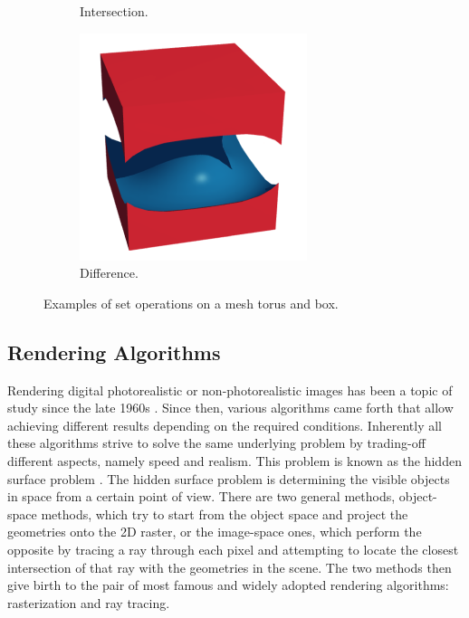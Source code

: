 \documentclass[a4paper,11pt,oneside]{article}
\begin{document}
\begin{figure}[ht]
\begin{subfigure}[b]{0.3\textwidth}
		\caption{Intersection.}
		\label{sec1:intersection}
	\end{subfigure}
	\hfill
	\begin{subfigure}[b]{0.3\textwidth}
		\centering
		\includegraphics[width=\textwidth]{section1/difference.png}
		\caption{Difference.}
		\label{sec1:difference}
	\end{subfigure}
	\hfill
	\caption{Examples of set operations on a mesh torus and box.}
	\label{sec1:set-operations-examples}
\end{figure}

  
\subsection{Rendering Algorithms}
  
Rendering digital photorealistic or non-photorealistic images has been a topic of study since the late 1960s \cite{INITIAL_RENDERING}. Since then, various algorithms came forth that allow achieving different results depending on the required conditions. Inherently all these algorithms strive to solve the same underlying problem by trading-off different aspects, namely speed and realism. This problem is known as the hidden surface problem \cite{hidden-surface-problem}. The hidden surface problem is determining the visible objects in space from a certain point of view. There are two general methods, object-space methods, which try to start from the object space and project the geometries onto the 2D raster, or the image-space ones, which perform the opposite by tracing a ray through each pixel and attempting to locate the closest intersection of that ray with the geometries in the scene. The two methods then give birth to the pair of most famous and widely adopted rendering algorithms: rasterization and ray tracing.
  
\end{document}
